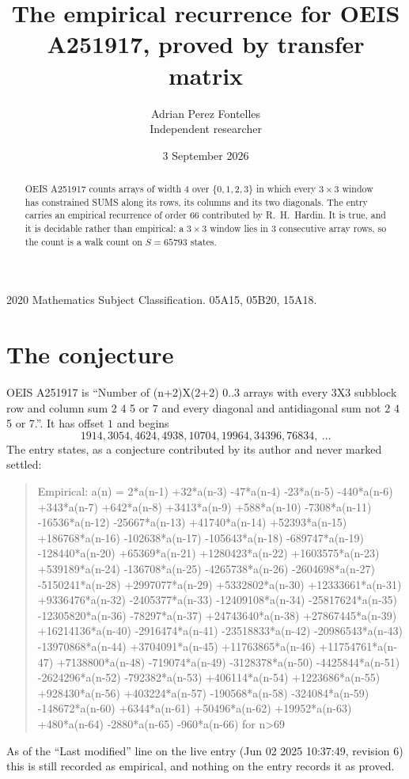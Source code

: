 \documentclass[11pt,a4paper]{article}
\title{The empirical recurrence for OEIS A251917, proved by transfer matrix}
\author{Adrian Perez Fontelles\\ \small Independent researcher}
\date{3 September 2026}
\theoremstyle{plain}
\theoremstyle{definition}
\begin{document}
\maketitle

\begin{abstract}
OEIS A251917 counts arrays of width $4$ over $\{0,1,2,3\}$ in which every $3\times3$ window has
constrained SUMS along its rows, its columns and its two diagonals. The entry carries an
empirical recurrence of order $66$ contributed by R.~H.~Hardin. It is true, and it is
decidable rather than empirical: a $3\times3$ window lies in $3$ consecutive array rows,
so the count is a walk count on $S=65793$ states.
\end{abstract}

\noindent\small 2020 Mathematics Subject Classification. 05A15, 05B20, 15A18.\normalsize

\section{The conjecture}

OEIS A251917 is ``Number of (n+2)X(2+2) 0..3 arrays with every 3X3 subblock row and column sum 2 4 5 or 7 and every diagonal and antidiagonal sum not 2 4 5 or 7.''. It has offset $1$ and begins
\[
1914, 3054, 4624, 4938, 10704, 19964, 34396, 76834,\ \dots
\]
The entry states, as a conjecture contributed by its author and never marked settled:
\begin{quote}
Empirical: a(n) = 2*a(n-1) +32*a(n-3) -47*a(n-4) -23*a(n-5) -440*a(n-6) +343*a(n-7) +642*a(n-8) +3413*a(n-9) +588*a(n-10) -7308*a(n-11) -16536*a(n-12) -25667*a(n-13) +41740*a(n-14) +52393*a(n-15) +186768*a(n-16) -102638*a(n-17) -105643*a(n-18) -689747*a(n-19) -128440*a(n-20) +65369*a(n-21) +1280423*a(n-22) +1603575*a(n-23) +539189*a(n-24) -136708*a(n-25) -4265738*a(n-26) -2604698*a(n-27) -5150241*a(n-28) +2997077*a(n-29) +5332802*a(n-30) +12333661*a(n-31) +9336476*a(n-32) -2405377*a(n-33) -12409108*a(n-34) -25817624*a(n-35) -12305820*a(n-36) -78297*a(n-37) +24743640*a(n-38) +27867445*a(n-39) +16214136*a(n-40) -2916474*a(n-41) -23518833*a(n-42) -20986543*a(n-43) -13970868*a(n-44) +3704091*a(n-45) +11763865*a(n-46) +11754761*a(n-47) +7138800*a(n-48) -719074*a(n-49) -3128378*a(n-50) -4425844*a(n-51) -2624296*a(n-52) -792382*a(n-53) +406114*a(n-54) +1223686*a(n-55) +928430*a(n-56) +403224*a(n-57) -190568*a(n-58) -324084*a(n-59) -148672*a(n-60) +6344*a(n-61) +50496*a(n-62) +19952*a(n-63) +480*a(n-64) -2880*a(n-65) -960*a(n-66) for n>69
\end{quote}
As of the ``Last modified'' line on the live entry (Jun 02 2025 10:37:49, revision 6) this is still
recorded as empirical, and nothing on the entry records it as proved.
\end{document}
